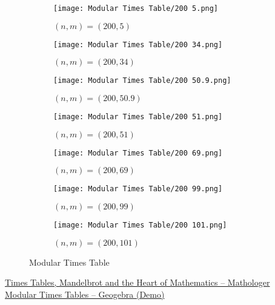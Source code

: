 \documentclass[../../Problems]{subfiles}
\begin{document}
\begin{figure}[H]
	\begin{subfigure}{0.145\linewidth}
		\texttt{[image: Modular Times Table/200 5.png]}
		\caption{$(n,m) = (200,5)$}
	\end{subfigure}
	\begin{subfigure}{0.145\linewidth}
		\texttt{[image: Modular Times Table/200 34.png]}
		\caption{$(n,m) = (200,34)$}
	\end{subfigure}
	\begin{subfigure}{0.145\linewidth}
		\texttt{[image: Modular Times Table/200 50.9.png]}
		\caption{$(n,m) = (200,50.9)$}
	\end{subfigure}
	\begin{subfigure}{0.145\linewidth}
		\texttt{[image: Modular Times Table/200 51.png]}
		\caption{$(n,m) = (200,51)$}
	\end{subfigure}
	\begin{subfigure}{0.145\linewidth}
		\texttt{[image: Modular Times Table/200 69.png]}
		\caption{$(n,m) = (200,69)$}
	\end{subfigure}
	\begin{subfigure}{0.145\linewidth}
		\texttt{[image: Modular Times Table/200 99.png]}
		\caption{$(n,m) = (200,99)$}
	\end{subfigure}
	\begin{subfigure}{0.145\linewidth}
		\texttt{[image: Modular Times Table/200 101.png]}
		\caption{$(n,m) = (200,101)$}
	\end{subfigure}
	\caption{Modular Times Table}
	\label{fig:timestabletestcases}
\end{figure}
\begin{funvideo}
	\href{https://youtu.be/qhbuKbxJsk8}{Times Tables, Mandelbrot and the Heart of Mathematics -- Mathologer}\\
	\href{https://www.geogebra.org/m/z8wrdret}{Modular Times Tables -- Geogebra (Demo)}
\end{funvideo}
\recalctypearea
\end{document}
